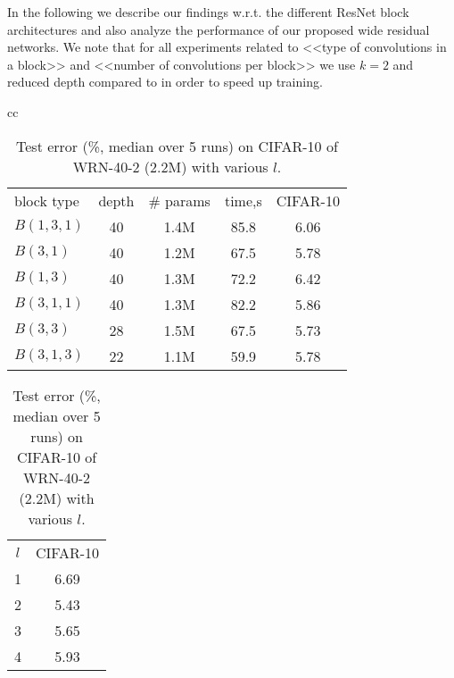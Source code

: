 \documentclass{bmvc2k}
\begin{document}
In the following we describe our findings w.r.t. the different  ResNet block architectures and also analyze the performance of our proposed wide residual networks.
We note that for all experiments related to <<type of convolutions in a block>> and <<number of convolutions per block>> we use  $k=2$ and reduced depth compared to \cite{basicblock2} in order to speed up training.\begin{table}
  \begin{tabular}{cc}
\begin{minipage}[c]{8cm}
  \centering
  \begin{tabular}{l|c|c|c|c}
    \hline
    block type & depth & \# params & time,s & CIFAR-10 \\
    \Xhline{2\arrayrulewidth}
$B(1,3,1)$ & 40 & 1.4M & 85.8 & 6.06  \\
$B(3,1)$ & 40 & 1.2M & 67.5 & 5.78  \\
$B(1,3)$ & 40 & 1.3M & 72.2 & 6.42  \\
$B(3,1,1)$ & 40 & 1.3M & 82.2 & 5.86  \\
$B(3,3)$ & 28 & 1.5M & 67.5 & 5.73  \\
$B(3,1,3)$ & 22 & 1.1M & 59.9 & 5.78  \\
    \hline
  \end{tabular}
\caption{Test error (\%, median over 5 runs) on CIFAR-10 of residual networks with $k=2$ and different block types. Time column measures one training epoch.}
  \label{table:blocks}
\end{minipage}
\hspace{0.5cm}
\begin{minipage}[c]{4cm}
  \centering
  \begin{tabular}{c|c}
    \hline
    $l$ & CIFAR-10 \\
    \Xhline{2\arrayrulewidth}
    1 & 6.69 \\
    2 & 5.43 \\
    3 & 5.65 \\
    4 & 5.93 \\
    \hline
  \end{tabular}
\caption{Test error (\%, median over 5 runs) on CIFAR-10 of WRN-40-2 (2.2M) with various $l$.}
  \label{table:blocks_l}
\end{minipage}
\end{tabular}
\end{table}
\end{document}
